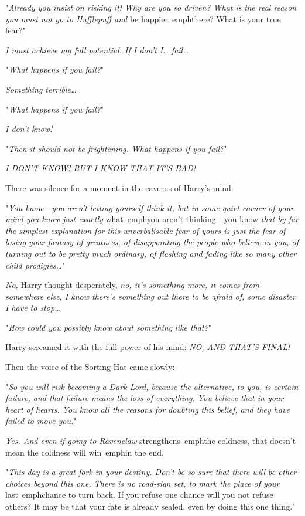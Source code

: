 "\emph{Already you insist on risking it! Why are you so driven? What is the 
real reason you must not go to Hufflepuff and} be happier\ emph{there? What is 
your true fear?}"

\emph{I must achieve my full potential. If I don't I{\ldots} fail{\ldots}}

"\emph{What happens if you fail?}"

\emph{Something terrible{\ldots}}

"\emph{What happens if you fail?}"

\emph{I don't know!}

"\emph{Then it should not be frightening. What happens if you fail?}"

\emph{I DON'T KNOW! BUT I KNOW THAT IT'S BAD!}

There was silence for a moment in the caverns of Harry's mind.

"\emph{You know---you aren't letting yourself think it, but in some quiet 
corner of your mind you know just exactly} what\ emph{you aren't 
thinking---you} know \emph{that by far the simplest explanation for this 
unverbalisable fear of yours is just the fear of losing your fantasy of 
greatness, of disappointing the people who believe in you, of turning out to be 
pretty much ordinary, of flashing and fading like so many other child 
prodigies{\ldots}}"

\emph{No,} Harry thought desperately, \emph{no, it's something more, it comes 
from somewhere else, I know there's something out there to be afraid of, some 
disaster I have to stop{\ldots}}

"\emph{How could you possibly know about something like that?}"

Harry screamed it with the full power of his mind: \emph{NO, AND THAT'S FINAL!}

Then the voice of the Sorting Hat came slowly:

"\emph{So you will risk becoming a Dark Lord, because the alternative, to you, 
is certain failure, and that failure means the loss of everything. You believe 
that in your heart of hearts. You know all the reasons for doubting this 
belief, and they have failed to move you.}"

\emph{Yes. And even if going to Ravenclaw} strengthens\ emph{the coldness, that 
doesn't mean the coldness will} win\ emph{in the end.}

"\emph{This day is a great fork in your destiny. Don't be so sure that there 
will be other choices beyond this one. There is no road-sign set, to mark the 
place of your} last\ emph{chance to turn back. If you refuse one chance will 
you not refuse others? It may be that your fate is already sealed, even by 
doing this one thing.}"

